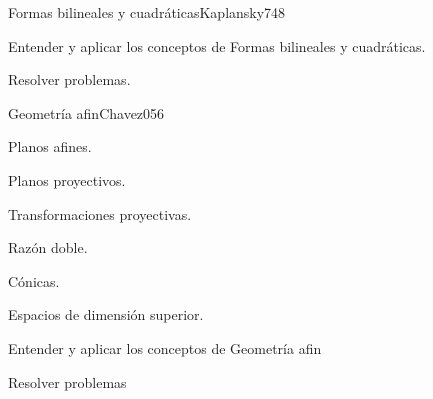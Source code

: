 \begin{sumilla}
\begin{unit}{Formas bilineales y cuadr\'aticas}{Kaplansky74}{8}
   \begin{objetivos}
         \item Entender y aplicar los conceptos de Formas bilineales y cuadr\'aticas.
         \item Resolver problemas.
   \end{objetivos}
\end{unit}

\begin{unit}{Geometr\'ia afin}{Chavez05}{6}
   \begin{topicos}
         \item  Planos afines.
	 \item  Planos proyectivos.
         \item  Transformaciones proyectivas.
	 \item  Raz\'on doble.
         \item  C\'onicas.
         \item  Espacios de dimensi\'on superior.
   \end{topicos}

   \begin{objetivos}
         \item  Entender y aplicar los conceptos de Geometr\'ia afin
         \item  Resolver problemas
   \end{objetivos}
\end{unit}

\begin{bibliografia}
\end{bibliografia}

\end{sumilla}


